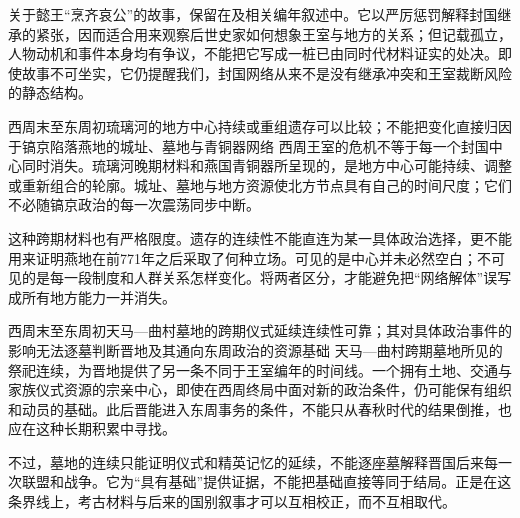 关于懿王“烹齐哀公”的故事，保留在及相关编年叙述中。它以严厉惩罚解释封国继承的紧张，因而适合用来观察后世史家如何想象王室与地方的关系；但记载孤立，人物动机和事件本身均有争议，不能把它写成一桩已由同时代材料证实的处决。即使故事不可坐实，它仍提醒我们，封国网络从来不是没有继承冲突和王室裁断风险的静态结构。

\begin{event}{西周末至东周初}{琉璃河的地方中心持续或重组}{遗存可以比较；不能把变化直接归因于镐京陷落}{燕地的城址、墓地与青铜器网络}
西周王室的危机不等于每一个封国中心同时消失。琉璃河晚期材料和燕国青铜器所呈现的，是地方中心可能持续、调整或重新组合的轮廓。城址、墓地与地方资源使北方节点具有自己的时间尺度；它们不必随镐京政治的每一次震荡同步中断。

这种跨期材料也有严格限度。遗存的连续性不能直连为某一具体政治选择，更不能用来证明燕地在前771年之后采取了何种立场。可见的是中心并未必然空白；不可见的是每一段制度和人群关系怎样变化。将两者区分，才能避免把“网络解体”误写成所有地方能力一并消失。
\end{event}

\begin{event}{西周末至东周初}{天马—曲村墓地的跨期仪式延续}{连续性可靠；其对具体政治事件的影响无法逐墓判断}{晋地及其通向东周政治的资源基础}
天马—曲村跨期墓地所见的祭祀连续，为晋地提供了另一条不同于王室编年的时间线。一个拥有土地、交通与家族仪式资源的宗亲中心，即使在西周终局中面对新的政治条件，仍可能保有组织和动员的基础。此后晋能进入东周事务的条件，不能只从春秋时代的结果倒推，也应在这种长期积累中寻找。

不过，墓地的连续只能证明仪式和精英记忆的延续，不能逐座墓解释晋国后来每一次联盟和战争。它为“具有基础”提供证据，不能把基础直接等同于结局。正是在这条界线上，考古材料与后来的国别叙事才可以互相校正，而不互相取代。
\end{event}
